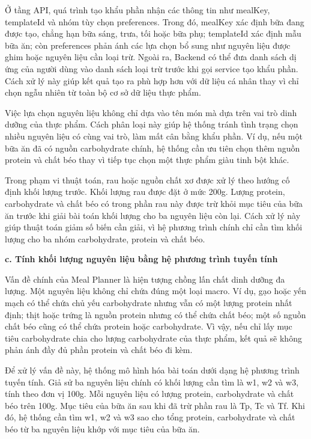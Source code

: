 Ở tầng API, quá trình tạo khẩu phần nhận các thông tin như mealKey, templateId và nhóm tùy chọn preferences. Trong đó, mealKey xác định bữa đang được tạo, chẳng hạn bữa sáng, trưa, tối hoặc bữa phụ; templateId xác định mẫu bữa ăn; còn preferences phản ánh các lựa chọn bổ sung như nguyên liệu được ghim hoặc nguyên liệu cần loại trừ. Ngoài ra, Backend có thể đưa danh sách dị ứng của người dùng vào danh sách loại trừ trước khi gọi service tạo khẩu phần. Cách xử lý này giúp kết quả tạo ra phù hợp hơn với dữ liệu cá nhân thay vì chỉ chọn ngẫu nhiên từ toàn bộ cơ sở dữ liệu thực phẩm.

Việc lựa chọn nguyên liệu không chỉ dựa vào tên món mà dựa trên vai trò dinh dưỡng của thực phẩm. Cách phân loại này giúp hệ thống tránh tình trạng chọn nhiều nguyên liệu có cùng vai trò, làm mất cân bằng khẩu phần. Ví dụ, nếu một bữa ăn đã có nguồn carbohydrate chính, hệ thống cần ưu tiên chọn thêm nguồn protein và chất béo thay vì tiếp tục chọn một thực phẩm giàu tinh bột khác.

Trong phạm vi thuật toán, rau hoặc nguồn chất xơ được xử lý theo hướng cố định khối lượng trước. Khối lượng rau được đặt ở mức 200g. Lượng protein, carbohydrate và chất béo có trong phần rau này được trừ khỏi mục tiêu của bữa ăn trước khi giải bài toán khối lượng cho ba nguyên liệu còn lại. Cách xử lý này giúp thuật toán giảm số biến cần giải, vì hệ phương trình chính chỉ cần tìm khối lượng cho ba nhóm carbohydrate, protein và chất béo.

\textbf{c. Tính khối lượng nguyên liệu bằng hệ phương trình tuyến tính}

Vấn đề chính của Meal Planner là hiện tượng chồng lấn chất dinh dưỡng đa lượng. Một nguyên liệu không chỉ chứa đúng một loại macro. Ví dụ, gạo hoặc yến mạch có thể chứa chủ yếu carbohydrate nhưng vẫn có một lượng protein nhất định; thịt hoặc trứng là nguồn protein nhưng có thể chứa chất béo; một số nguồn chất béo cũng có thể chứa protein hoặc carbohydrate. Vì vậy, nếu chỉ lấy mục tiêu carbohydrate chia cho lượng carbohydrate của thực phẩm, kết quả sẽ không phản ánh đầy đủ phần protein và chất béo đi kèm.

Để xử lý vấn đề này, hệ thống mô hình hóa bài toán dưới dạng hệ phương trình tuyến tính. Giả sử ba nguyên liệu chính có khối lượng cần tìm là w1, w2 và w3, tính theo đơn vị 100g. Mỗi nguyên liệu có lượng protein, carbohydrate và chất béo trên 100g. Mục tiêu của bữa ăn sau khi đã trừ phần rau là Tp, Tc và Tf. Khi đó, hệ thống cần tìm w1, w2 và w3 sao cho tổng protein, carbohydrate và chất béo từ ba nguyên liệu khớp với mục tiêu của bữa ăn.

